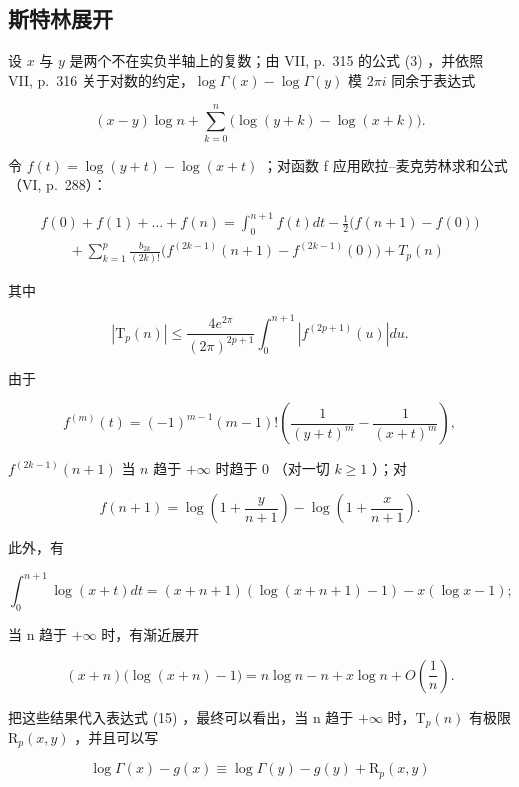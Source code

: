 \subsection{斯特林展开}

设 \(x\) 与 \(y\) 是两个不在实负半轴上的复数；由 VII, p.~315 的公式 (3) ，并依照 VII, p.~316 关于对数的约定，\(\log \Gamma(x) - \log \Gamma(y)\) 模 \(2\pi i\) 同余于表达式

\[
(x - y) \log n + \sum_ {k = 0} ^ {n} \Big (\log (y + k) - \log (x + k) \Big).\tag{15}
\]

令 \(f(t) = \log(y + t) - \log(x + t)\) ；对函数 f 应用欧拉–麦克劳林求和公式（VI, p.~288）：

\[
\begin{array}{l} f (0) + f (1) + \dots + f (n) = \int_ {0} ^ {n + 1} f (t) d t - \frac {1}{2} \big (f (n + 1) - f (0) \big) \\ \qquad + \sum_ {k = 1} ^ {p} \frac {b _ {2 k}}{(2 k) !} \big (f ^ {(2 k - 1)} (n + 1) - f ^ {(2 k - 1)} (0) \big) + T _ {p} (n) \end{array}
\]

其中

\[
\left| \mathrm{T} _ {p} (n) \right| \leqslant \frac {4 e ^ {2 \pi}}{(2 \pi) ^ {2 p + 1}} \int_ {0} ^ {n + 1} \left| f ^ {(2 p + 1)} (u) \right| d u.\tag{16}
\]

由于

\[
f ^ {(m)} (t) = (- 1) ^ {m - 1} (m - 1)! \left(\frac {1}{(y + t) ^ {m}} - \frac {1}{(x + t) ^ {m}}\right),
\]

\(f^{(2k - 1)}(n + 1)\) 当 \(n\) 趋于 \(+\infty\) 时趋于 0 （对一切 \(k \geqslant 1\) ）；对

\[
f (n + 1) = \log \left(1 + \frac {y}{n + 1}\right) - \log \left(1 + \frac {x}{n + 1}\right).
\]

此外，有

\[
\int_ {0} ^ {n + 1} \log (x + t) d t = (x + n + 1) (\log (x + n + 1) - 1) - x (\log x - 1);
\]

当 n 趋于 \(+\infty\) 时，有渐近展开

\[
(x + n) \bigl (\log (x + n) - 1 \bigr) = n \log n - n + x \log n + O \left(\frac {1}{n}\right).
\]

把这些结果代入表达式 (15) ，最终可以看出，当 n 趋于 \(+\infty\) 时，\(\mathrm{T}_{p}(n)\) 有极限 \(\mathrm{R}_{p}(x, y)\) ，并且可以写

\[
\log \Gamma (x) - g (x) \equiv \log \Gamma (y) - g (y) + \mathrm{R} _ {p} (x, y)\tag{mod.  \( 2\pi i \)}
\]

